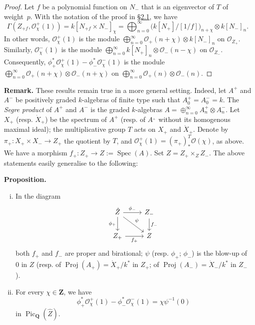 \documentclass{article}
\newenvironment{itenv}[1]
  {\phantomsection\par\medskip\noindent\textbf{#1.}\itshape}
  {\par\medskip}
\newenvironment{rmenv}[1]
  {\phantomsection\par\medskip\noindent\textbf{#1.}\rmfamily}
  {\par\medskip}
\newcommand{\scr}[1]{{\mathscr{#1}}}
\newcommand{\QQ}{\mathbf{Q}}
\newcommand{\ZZ}{\mathbf{Z}}
\DeclareMathOperator{\Pic}{Pic}
\DeclareMathOperator{\Spec}{Spec}
\DeclareMathOperator{\Proj}{Proj}
\newcommand{\oldpage}[1]{\marginpar{\footnotesize$\Big\vert$ \textit{p.~#1}}}
\begin{document}
\begin{proof}
  Let $f$ be a polynomial function on $N_-$ that is an eigenvector of $T$ of weight~$p$.
  With the notation of the proof in \hyperref[2.1]{\S2.1}, we have
  \[
    \Gamma(Z_{+f},\scr{O}_\chi^+(1))
    = k[N_{+f}\times N_-]_\chi
    = \bigoplus_{n=0}^\infty\big(k[N_+]/[1/f]\big)_{n+\chi}\otimes k[N_-]_n.
  \]
  In other words, $\scr{O}_\chi^+(1)$ is the module $\bigoplus_{n=0}^\infty\scr{O}_+(n+\chi)\otimes k[N_-]_n$ on $\scr{O}_{Z_+}$.
  Similarly, $\scr{O}_\chi^-(1)$ is the module $\bigoplus_{n=0}^\infty k[N_+]_n\otimes\scr{O}_-(n-\chi)$ on $\scr{O}_{Z_-}$.
  Consequently, $\phi_+^*\scr{O}_\chi^+(1)-\phi_-^*\scr{O}_\chi^-(1)$ is the module $\bigoplus_{n=0}^\infty\scr{O}_+(n+\chi)\otimes\scr{O}_-(n+\chi)$ on $\bigoplus_{n=0}^\infty\scr{O}_+(n)\otimes\scr{O}_-(n)$.
\end{proof}

\begin{rmenv}{Remark}
  These results remain true in a more general setting.
  Indeed, let $A^+$ and $A^-$ be positively graded $k$-algebras of finite type such that $A_0^+=A_0^-=k$.
  The \emph{Segre product} \cite[Chapter~4]{GW} of $A^+$ and $A^-$ is the graded $k$-algebras $A=\oplus_{n=0}^\infty A_n^+\otimes A_n^-$.
  Let $X_+$ (resp. $\dot{X}_+$) be the spectrum of $A^+$ (resp. of $A^_+$ without its homogenous maximal ideal);
  the multiplicative group $T$ acts on $X_+$ and $\dot{X}_+$.
  Denote by $\pi_+\colon X_+\times X_-\to Z_+$ the quotient by $T$, and $\scr{O}_\chi^+(1)=(\pi_+)_*^T\scr{O}(\chi)$, as above.
  We have a morphism $f_+\colon Z_+\to Z:=\Spec(A)$.
  Set $\hat{Z}=Z_+\times_Z Z_-$.
  The above statements easily generalise to the following:
\end{rmenv}

\oldpage{521}

\begin{itenv}{Proposition}
  \begin{enumerate}[(i)]
    \item In the diagram
      \[
        \begin{tikzcd}
          \hat{Z} \ar[r,"\phi_-"] \ar[d,swap,"\phi_+"] \ar[dr,"\psi"]
          & Z_- \ar[d,"f_-"]
        \\Z_+ \ar[r,swap,"f_+"]
          & Z
        \end{tikzcd}
      \]
      both $f_+$ and $f_-$ are proper and birational;
      $\psi$ (resp. $\phi_+$; $\phi_-$) is the blow-up of $0$ in $Z$ (resp. of $\Proj(A_+)=\dot{X}_+/k^*$ in $Z_+$; of $\Proj(A_-)=\dot{X}_-/k^*$ in $Z_-$).
    \item For every $\chi\in\ZZ$, we have
      \[
        \phi_+^*\scr{O}_\chi^+(1) - \phi_-^*\scr{O}_\chi^-(1)
        = \chi\psi^{-1}(0)
      \]
      in $\Pic_{\QQ}(\hat{Z})$.
  \end{enumerate}
\end{itenv}
\end{document}
